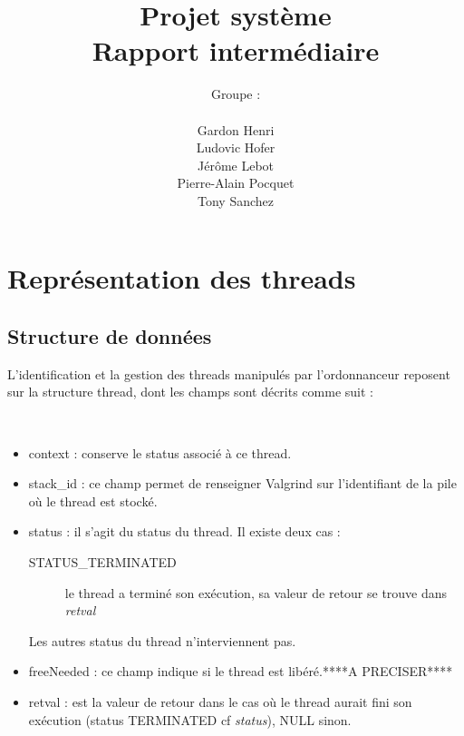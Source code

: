 \documentclass{article}
\author{Groupe :\\ \\Gardon Henri\\Ludovic Hofer\\Jérôme Lebot\\Pierre-Alain Pocquet\\Tony Sanchez}
\title{Projet système \\ Rapport intermédiaire}
\begin{document}
\maketitle

\newpage

\section{Représentation des threads}

\subsection{Structure de données}

L'identification et la gestion des threads manipulés par l'ordonnanceur reposent sur
la structure thread, dont les champs sont décrits comme suit :

    \noindent\parindent11.10839pt
\\
\begin{itemize}
    \item context : conserve le status associé à ce thread.
    \item stack\_id : ce champ permet de renseigner Valgrind sur l'identifiant de la pile où le thread est stocké. 
    \item status : il s'agit du status du thread. Il existe deux cas :
    \begin{description}
        \item[STATUS\_TERMINATED]le thread a terminé son exécution, sa valeur de retour se trouve dans \textit{retval}
    \end{description}
    Les autres status du thread n'interviennent pas.
    \item freeNeeded : ce champ indique si le thread est libéré.****A PRECISER****
    \item retval : est la valeur de retour dans le cas où le thread aurait fini son exécution (status TERMINATED cf \textit{status}), NULL sinon.
\end{itemize}
\end{document}
